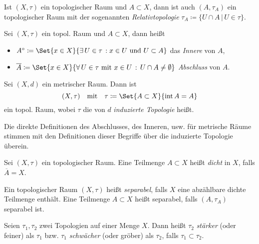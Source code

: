 \documentclass{cheat-sheet}
\newcommand{\inte}{\mathop{\mathrm{int}}} %
\begin{document}
\begin{defn}
  Ist $(X, \tau)$ ein topologischer Raum und $A \subset X$, dann ist auch $(A, \tau_A)$ ein topologischer Raum mit der sogenannten \emph{Relativtopologie} $\tau_A \coloneqq \{ U \cap A \,|\,U \in \tau \}$.
\end{defn}

\begin{defn}
  Sei $(X, \tau)$ ein topol. Raum und $A \subset X$, dann heißt
  \begin{itemize}
    \item $A^\circ \coloneqq \Set{x \in X}{ \ex{U \in \tau} \! x \in U \text{ und } U \subset A }$ das \emph{Innere} von $A$,
    \item $\overline{A} \coloneqq \Set{x \in X}{ \fa{U \in \tau \text{ mit } x \in U} U \cap A \not= \emptyset }$ \emph{Abschluss} von $A$.
  \end{itemize}
\end{defn}

\begin{defn}
  Sei $(X, d)$ ein metrischer Raum. Dann ist
  \[ (X, \tau) \quad \text{mit} \quad \tau \coloneqq \Set{A \subset X}{ \inte A = A } \]
  ein topol. Raum, wobei $\tau$ die von $d$ \emph{induzierte Topologie} heißt.
\end{defn}

\begin{bem}
  Die direkte Definitionen des Abschlusses, des Inneren, usw. für metrische Räume stimmen mit den Definitionen dieser Begriffe über die induzierte Topologie überein.
\end{bem}

\begin{defn}
  Sei $(X, \tau)$ ein topologischer Raum. Eine Teilmenge $A \subset X$ heißt \emph{dicht} in $X$, falls $\overline{A} = X$.
\end{defn}

\begin{defn}
  Ein topologischer Raum $(X, \tau)$ heißt \emph{separabel}, falls $X$ eine abzählbare dichte Teilmenge enthält. Eine Teilmenge $A \subset X$ heißt separabel, falls $(A, \tau_A)$ separabel ist.
\end{defn}

\begin{defn}
  Seien $\tau_1, \tau_2$ zwei Topologien auf einer Menge $X$. Dann heißt $\tau_2$ \emph{stärker} (oder feiner) als $\tau_1$ bzw. $\tau_1$ \emph{schwächer} (oder gröber) als $\tau_2$, falls $\tau_1 \subset \tau_2$.
\end{defn}
\end{document}
